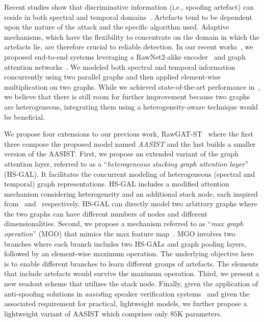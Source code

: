 \documentclass{article}
\begin{document}
Recent studies show that discriminative information (i.e., spoofing artefact) can reside in both spectral and temporal domains~\cite{yang2019significance,sriskandaraja2016investigation,jung2019replay,odyssey2020CQCC,tak2020spoofing}. 
Artefacts tend to be dependent upon the nature of the attack and the specific algorithm used.
Adaptive mechanisms, which have the flexibility to concentrate on the domain in which the artefacts lie, are therefore crucial to reliable detection. 
In our recent works~\cite{tak2021graph,tak2021end}, we proposed end-to-end systems leveraging a RawNet2-alike encoder~\cite{jung20c_interspeech,tak2021rawnet} and graph attention networks~\cite{velickovic2018graph}. 
We modeled both spectral and temporal information concurrently using two parallel graphs and then applied element-wise multiplication on two graphs. 
While we achieved state-of-the-art performance in~\cite{tak2021end}, we believe that there is still room for further improvement because two graphs are heterogeneous, integrating them using a heterogeneity-aware technique would be beneficial.  

We propose four extensions to our previous work, RawGAT-ST~\cite{tak2021end} where the first three compose the proposed model named {\em AASIST} and the last builds a smaller version of the AASIST. 
First, we propose an extended variant of the graph attention layer, referred to as a ``{\em heterogeneous stacking graph attention layer}'' (HS-GAL). 
It facilitates the concurrent modeling of heterogeneous (spectral and temporal) graph representations. 
HS-GAL includes a modified attention mechanism considering heterogeneity and an additional stack node, each inspired from~\cite{wang2019heterogeneous} and~\cite{kenton2019bert} respectively.
HS-GAL can directly model two arbitrary graphs where the two graphs can have different numbers of nodes and different dimensionalities.  
Second, we propose a mechanism referred to as ``{\em max graph operation}'' (MGO) that mimics the max feature map~\cite{wu2018light}. 
MGO involves two branches where each branch includes two HS-GALs and graph pooling layers, followed by an element-wise maximum operation. 
The underlying objective here is to enable different branches to learn different groups of artefacts. 
The elements that include artefacts would survive the maximum operation. 
Third, we present a new readout scheme that utilizes the stack node.
Finally, given the application of anti-spoofing solutions in {\em aasist}ing speaker verification systems~\cite{Kinnunen2018tdcf,shim2020integrated} and given the associated requirement for practical, lightweight models, we further propose a lightweight variant of AASIST which comprises only $85$K parameters.
\end{document}
